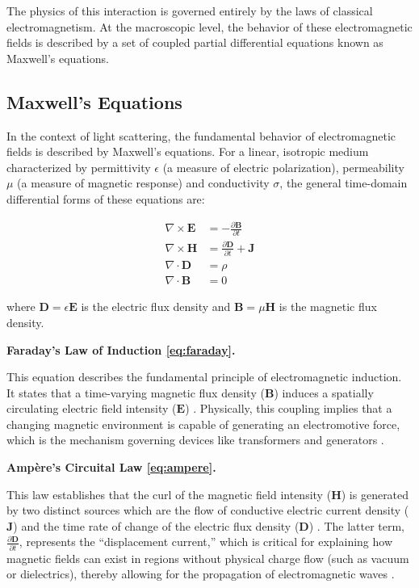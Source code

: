 \documentclass[class=report, crop=false]{standalone}
\begin{document}
The physics of this interaction is governed entirely by the laws of classical electromagnetism. At the macroscopic level, the behavior of these electromagnetic fields is described by a set of coupled partial differential equations known as Maxwell's equations.

\subsection{Maxwell's Equations}

In the context of light scattering, the fundamental behavior of electromagnetic fields is described by Maxwell's equations. For a linear, isotropic medium characterized by permittivity $\epsilon$ (a measure of electric polarization), permeability $\mu$ (a measure of magnetic response) and conductivity $\sigma$, the general time-domain differential forms of these equations are:

\begin{align}
\nabla \times \bm{E} &= -\frac{\partial \bm{B}}{\partial t} \label{eq:faraday} \\
\nabla \times \bm{H} &= \frac{\partial \bm{D}}{\partial t} + \bm{J} \label{eq:ampere} \\
\nabla \cdot \bm{D} &= \rho \label{eq:gauss_e} \\
\nabla \cdot \bm{B} &= 0 \label{eq:gauss_m}
\end{align}

\noindent where $\bm{D} = \epsilon \bm{E}$ is the electric flux density and $\bm{B} = \mu \bm{H}$ is the magnetic flux density.

\vspace{12pt}

\noindent\textbf{Faraday's Law of Induction \eqref{eq:faraday}.}

\noindent This equation describes the fundamental principle of electromagnetic induction. It states that a time-varying magnetic flux density ($\bm{B}$) induces a spatially circulating electric field intensity ($\bm{E}$) \citep{Jin2015}. Physically, this coupling implies that a changing magnetic environment is capable of generating an electromotive force, which is the mechanism governing devices like transformers and generators \citep{Jin2015}.

\vspace{12pt}

\noindent\textbf{Ampère's Circuital Law \eqref{eq:ampere}.}

\noindent This law establishes that the curl of the magnetic field intensity ($\bm{H}$) is generated by two distinct sources which are the flow of conductive electric current density ($\bm{J}$) and the time rate of change of the electric flux density ($\bm{D}$) \citep{Jin2015}. The latter term, $\frac{\partial \bm{D}}{\partial t}$, represents the ``displacement current,'' which is critical for explaining how magnetic fields can exist in regions without physical charge flow (such as vacuum or dielectrics), thereby allowing for the propagation of electromagnetic waves \citep{Jin2015}.
\end{document}
